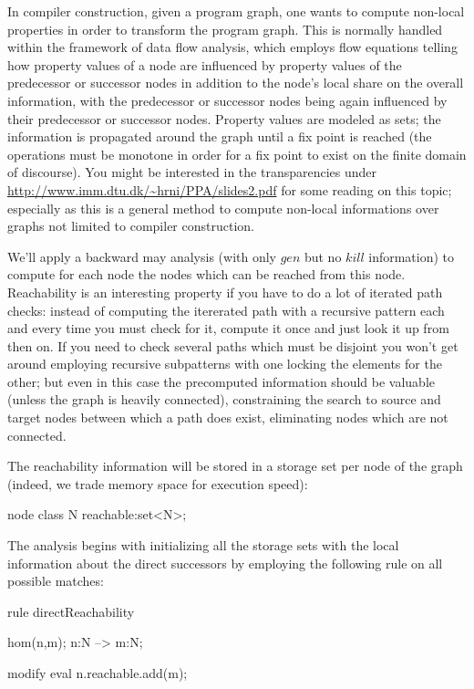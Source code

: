 In compiler construction, given a program graph, one wants to compute non-local properties in order to transform the program graph.
This is normally handled within the framework of data flow analysis, which employs flow equations telling how property values of a node are influenced by property values of the predecessor or successor nodes in addition to the node's local share on the overall information, with the predecessor or successor nodes being again influenced by their predecessor or successor nodes.
Property values are modeled as sets; the information is propagated around the graph until a fix point is reached (the operations must be monotone in order for a fix point to exist on the finite domain of discourse).
You might be interested in the transparencies under \url{http://www.imm.dtu.dk/~hrni/PPA/slides2.pdf} for some reading on this topic;
especially as this is a general method to compute non-local informations over graphs not limited to compiler construction.

We'll apply a backward may analysis (with only $gen$ but no $kill$ information) to compute for each node the nodes which can be reached from this node.
Reachability is an interesting property if you have to do a lot of iterated path checks:
instead of computing the itererated path with a recursive pattern each and every time you must check for it,
compute it once and just look it up from then on.
If you need to check several paths which must be disjoint you won't get around employing recursive subpatterns with one locking the elements for the other; but even in this case the precomputed information should be valuable (unless the graph is heavily connected), constraining the search to source and target nodes between which a path does exist, eliminating nodes which are not connected.

The reachability information will be stored in a storage set per node of the graph (indeed, we trade memory space for execution speed):
  \begin{example}
    \begin{grgen}
node class N
{
	reachable:set<N>;
}
    \end{grgen}
  \end{example}

The analysis begins with initializing all the storage sets with the local information about the direct successors by employing the following rule on all possible matches:
  \begin{example}
    \begin{grgen}
rule directReachability
{
  hom(n,m);
  n:N --> m:N;

  modify {
    eval { n.reachable.add(m); }
  }
}
    \end{grgen}
  \end{example}


